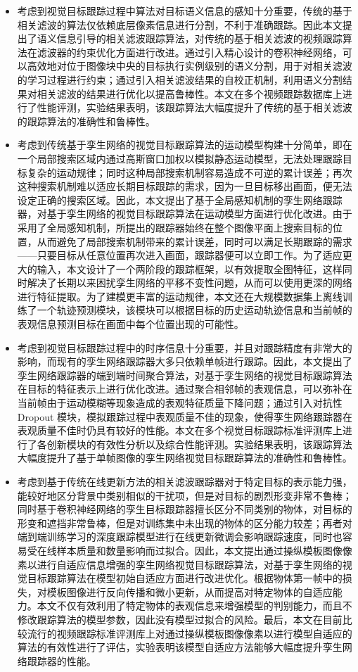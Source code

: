 \begin{itemize}
\item 考虑到视觉目标跟踪过程中算法对目标语义信息的感知十分重要，传统的基于相关滤波的算法仅依赖底层像素信息进行分割，不利于准确跟踪。因此本文提出了语义信息引导的相关滤波跟踪算法，对传统的基于相关滤波的视频跟踪算法在滤波器的约束优化方面进行改进。通过引入精心设计的卷积神经网络，可以高效地对位于图像块中央的目标执行实例级别的语义分割，用于对相关滤波的学习过程进行约束；通过引入相关滤波结果的自校正机制，利用语义分割结果对相关滤波的结果进行优化以提高鲁棒性。本文在多个视频跟踪数据库上进行了性能评测，实验结果表明，该跟踪算法大幅度提升了传统的基于相关滤波的跟踪算法的准确性和鲁棒性。
\item 考虑到传统基于孪生网络的视觉目标跟踪算法的运动模型构建十分简单，即在一个局部搜索区域内通过高斯窗口加权以模拟静态运动模型，无法处理跟踪目标复杂的运动规律；同时这种局部搜索机制容易造成不可逆的累计误差；再次这种搜索机制难以适应长期目标跟踪的需求，因为一旦目标移出画面，便无法设定正确的搜索区域。因此，本文提出了基于全局感知机制的孪生网络跟踪器，对基于孪生网络的视觉目标跟踪算法在运动模型方面进行优化改进。由于采用了全局感知机制，所提出的跟踪器始终在整个图像平面上搜索目标的位置，从而避免了局部搜索机制带来的累计误差，同时可以满足长期跟踪的需求——只要目标从任意位置再次进入画面，跟踪器便可以立即工作。为了适应更大的输入，本文设计了一个两阶段的跟踪框架，以有效提取全图特征，这样同时解决了长期以来困扰孪生网络的平移不变性问题，从而可以使用更深的网络进行特征提取。为了建模更丰富的运动规律，本文还在大规模数据集上离线训练了一个轨迹预测模块，该模块可以根据目标的历史运动轨迹信息和当前帧的表观信息预测目标在画面中每个位置出现的可能性。
\item 考虑到视觉目标跟踪过程中的时序信息十分重要，并且对跟踪精度有非常大的影响，而现有的孪生网络跟踪器大多只依赖单帧进行跟踪。因此，本文提出了孪生网络跟踪器的端到端时间聚合算法，对基于孪生网络的视觉目标跟踪算法在目标的特征表示上进行优化改进。通过聚合相邻帧的表观信息，可以弥补在当前帧由于运动模糊等现象造成的表观特征质量下降问题；通过引入对抗性 Dropout 模块，模拟跟踪过程中表观质量不佳的现象，使得孪生网络跟踪器在表观质量不佳时仍具有较好的性能。本文在多个视觉目标跟踪标准评测库上进行了各创新模块的有效性分析以及综合性能评测。实验结果表明，该跟踪算法大幅度提升了基于单帧图像的孪生网络视觉目标跟踪算法的准确性和鲁棒性。
\item 考虑到基于传统在线更新方法的相关滤波跟踪器对于特定目标的表示能力强，能较好地区分背景中类别相似的干扰项，但是对目标的剧烈形变非常不鲁棒；同时基于卷积神经网络的孪生目标跟踪器擅长区分不同类别的物体，对目标的形变和遮挡非常鲁棒，但是对训练集中未出现的物体的区分能力较差；再者对端到端训练学习的深度跟踪模型进行在线更新微调会影响跟踪速度，同时也容易受在线样本质量和数量影响而过拟合。因此，本文提出通过操纵模板图像像素以进行自适应信息增强的孪生网络视觉目标跟踪算法，对基于孪生网络的视觉目标跟踪算法在模型初始自适应方面进行改进优化。根据物体第一帧中的损失，对模板图像进行反向传播和微小更新，从而提高对特定物体的自适应能力。本文不仅有效利用了特定物体的表观信息来增强模型的判别能力，而且不修改跟踪算法的模型参数，因此没有模型过拟合的风险。最后，本文在目前比较流行的视频跟踪标准评测库上对通过操纵模板图像像素以进行模型自适应的算法的有效性进行了评估，实验表明该模型自适应方法能够大幅度提升孪生网络跟踪器的性能。

\end{itemize}
